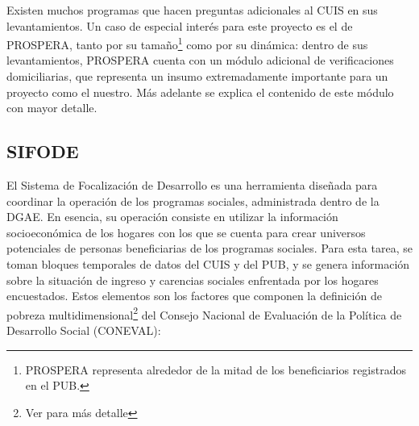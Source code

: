 \par
\noindent
Existen muchos programas que hacen preguntas adicionales al CUIS en sus levantamientos. Un caso de especial interés para este proyecto es el de PROSPERA, tanto por su tamaño\footnote{PROSPERA representa alrededor de la mitad de los beneficiarios registrados en el PUB.} como por su dinámica: dentro de sus levantamientos, PROSPERA cuenta con un módulo adicional de verificaciones domiciliarias, que representa un insumo extremadamente importante para un proyecto como el nuestro. Más adelante se explica el contenido de este módulo con mayor detalle.
\subsection*{SIFODE}
El Sistema de Focalización de Desarrollo es una herramienta diseñada para coordinar la operación de los programas sociales, administrada dentro de la DGAE. En esencia, su operación consiste en utilizar la información socioeconómica de los hogares con los que se cuenta para crear universos potenciales de personas beneficiarias de los programas sociales. Para esta tarea, se toman bloques temporales de datos del CUIS y del PUB, y se genera información sobre la situación de ingreso y carencias sociales enfrentada por los hogares encuestados. Estos elementos son los factores que componen la definición de pobreza multidimensional\footnote{Ver \cite{coneval_folleto} para más detalle} del Consejo Nacional de Evaluación de la Política de Desarrollo Social (CONEVAL):
